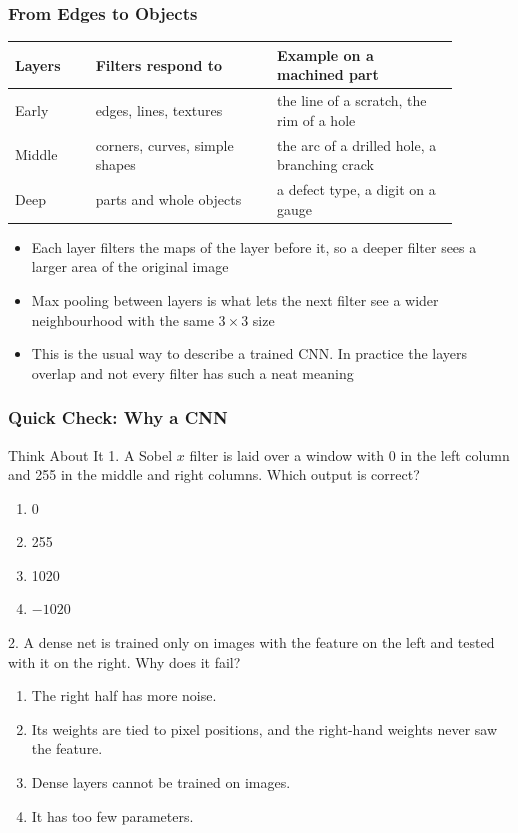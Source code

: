 \begin{frame}[fragile] \frametitle{From Edges to Objects}
\begin{center}
\small
\begin{tabular}{p{0.16\linewidth}p{0.36\linewidth}p{0.36\linewidth}}
\hline
Layers & Filters respond to & Example on a machined part \\
\hline
Early & edges, lines, textures & the line of a scratch, the rim of a hole \\
Middle & corners, curves, simple shapes & the arc of a drilled hole, a branching crack \\
Deep & parts and whole objects & a defect type, a digit on a gauge \\
\hline
\end{tabular}
\end{center}
\begin{itemize}
\item Each layer filters the maps of the layer before it, so a deeper filter sees a larger area of the original image
\item Max pooling between layers is what lets the next filter see a wider neighbourhood with the same $3 \times 3$ size
\item This is the usual way to describe a trained CNN. In practice the layers overlap and not every filter has such a neat meaning
\end{itemize}
\end{frame}

\begin{frame}[fragile] \frametitle{Quick Check: Why a CNN}
\begin{block}{Think About It}
1. A Sobel $x$ filter is laid over a window with 0 in the left column and 255 in the middle and right columns. Which output is correct?
\begin{enumerate}
  \item[A.] 0
  \item[B.] 255
  \item[C.] 1020
  \item[D.] $-1020$
\end{enumerate}
2. A dense net is trained only on images with the feature on the left and tested with it on the right. Why does it fail?
\begin{enumerate}
  \item[A.] The right half has more noise.
  \item[B.] Its weights are tied to pixel positions, and the right-hand weights never saw the feature.
  \item[C.] Dense layers cannot be trained on images.
  \item[D.] It has too few parameters.
\end{enumerate}
\end{block}
\end{frame}

